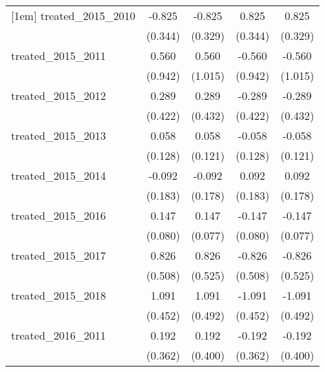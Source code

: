 {\begin{tabular}{l*{4}{c}}
[1em]
treated\_2015\_2010&      -0.825\sym{*}  &      -0.825\sym{*}  &       0.825\sym{*}  &       0.825\sym{*}  \\
            &     (0.344)         &     (0.329)         &     (0.344)         &     (0.329)         \\
[1em]
treated\_2015\_2011&       0.560         &       0.560         &      -0.560         &      -0.560         \\
            &     (0.942)         &     (1.015)         &     (0.942)         &     (1.015)         \\
[1em]
treated\_2015\_2012&       0.289         &       0.289         &      -0.289         &      -0.289         \\
            &     (0.422)         &     (0.432)         &     (0.422)         &     (0.432)         \\
[1em]
treated\_2015\_2013&       0.058         &       0.058         &      -0.058         &      -0.058         \\
            &     (0.128)         &     (0.121)         &     (0.128)         &     (0.121)         \\
[1em]
treated\_2015\_2014&      -0.092         &      -0.092         &       0.092         &       0.092         \\
            &     (0.183)         &     (0.178)         &     (0.183)         &     (0.178)         \\
[1em]
treated\_2015\_2016&       0.147         &       0.147         &      -0.147         &      -0.147         \\
            &     (0.080)         &     (0.077)         &     (0.080)         &     (0.077)         \\
[1em]
treated\_2015\_2017&       0.826         &       0.826         &      -0.826         &      -0.826         \\
            &     (0.508)         &     (0.525)         &     (0.508)         &     (0.525)         \\
[1em]
treated\_2015\_2018&       1.091\sym{*}  &       1.091\sym{*}  &      -1.091\sym{*}  &      -1.091\sym{*}  \\
            &     (0.452)         &     (0.492)         &     (0.452)         &     (0.492)         \\
[1em]
treated\_2016\_2011&       0.192         &       0.192         &      -0.192         &      -0.192         \\
            &     (0.362)         &     (0.400)         &     (0.362)         &     (0.400)         \\

\end{tabular}}
